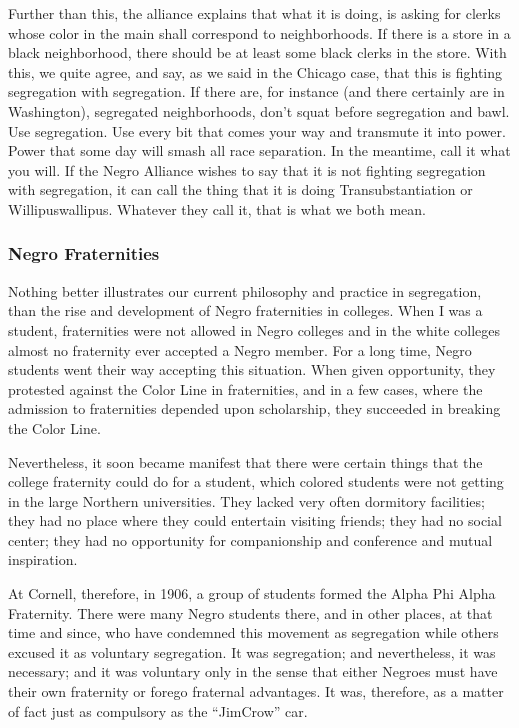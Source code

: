 \documentclass[letterpaper,10pt,english]{jupyterBook}
\begin{document}
\sphinxAtStartPar
Further than this, the alliance explains that what it is doing, is asking for clerks whose color in the main shall correspond to neighborhoods. If there is a store in a black neighborhood, there should be at least some black clerks in the store. With this, we quite agree, and say, as we said in the Chicago case, that this is fighting segregation with segregation. If there are, for instance (and there certainly are in Washington), segregated neighborhoods, don’t squat before segregation and bawl. Use segregation. Use every bit that comes your way and transmute it into power. Power that some day will smash all race separation. In the meantime, call it what you will. If the Negro Alliance wishes to say that it is not fighting segregation with segregation, it can call the thing that it is doing Transubstantiation or Willipuswallipus. Whatever they call it, that is what we both mean.


\subsubsection{Negro Fraternities}
\label{\detokenize{Volumes/41/06/counsels_of_despair:negro-fraternities}}
\sphinxAtStartPar
Nothing better illustrates our current philosophy and practice in segregation, than the rise and development of Negro fraternities in colleges. When I was a student, fraternities were not allowed in Negro colleges and in the white colleges almost no fraternity ever accepted a Negro member. For a long time, Negro students went their way accepting this situation. When given opportunity, they protested against the Color Line in fraternities, and in a few cases, where the admission to fraternities depended upon scholarship, they succeeded in breaking the Color Line.

\sphinxAtStartPar
Nevertheless, it soon became manifest that there were certain things that the college fraternity could do for a student, which colored students were not getting in the large Northern universities. They lacked very often dormitory facilities; they had no place where they could entertain visiting friends; they had no social center; they had no opportunity for companionship and conference and mutual inspiration.

\sphinxAtStartPar
At Cornell, therefore, in 1906, a group of students formed the Alpha Phi Alpha Fraternity. There were many Negro students there, and in other places, at that time and since, who have condemned this movement as segregation while others excused it as voluntary segregation. It was segregation; and nevertheless, it was necessary; and it was voluntary only in the sense that either Negroes must have their own fraternity or forego fraternal advantages. It was, therefore, as a matter of fact just as compulsory as the “Jim\sphinxhyphen{}Crow” car.
\end{document}
